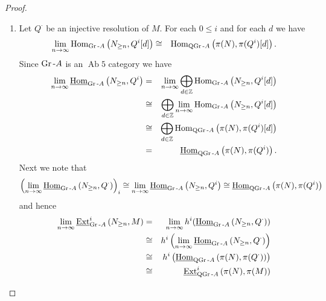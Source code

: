 \documentclass[dissertation.tex]{subfiles}
\begin{document}
\begin{prop}
  \begin{proof}
    \begin{enumerate}
    \item
      Let $Q^\cdot$ be an injective resolution of $M$.
      For each $0 \leq i$ and for each $d$ we have 
      \begin{eqnarray*}
        \lim_{n \rightarrow \infty}\Hom{\Gr{A}}{N_{\geq n}, Q^i[d]} &\cong& 
        \Hom{\QGr{A}}{\pi(N), \pi(Q^i)[d]}.
      \end{eqnarray*}
      Since $\Gr{A}$ is an $\operatorname{Ab} 5$ category we have
      \begin{eqnarray*}
        \lim_{n \rightarrow \infty}\HOM{\Gr{A}}{N_{\geq n}, Q^i} &=&
        \lim_{n \rightarrow \infty}\bigoplus_{d \in \Z} \Hom{\Gr{A}}{N_{\geq n}, Q^i[d]}\\
        &\cong& \bigoplus_{d \in \Z} \lim_{n \rightarrow \infty}\Hom{\Gr{A}}{N_{\geq n}, Q^i[d]}\\
        &\cong& \bigoplus_{d \in \Z} \Hom{\QGr{A}}{\pi(N), \pi(Q^i)[d]}\\
        &=&\HOM{\QGr{A}}{\pi(N), \pi(Q^i)}.
      \end{eqnarray*}
      Next we note that
      $$\left(\lim_{n \rightarrow \infty} \HOM{\Gr{A}}{N_{\geq n}, Q^\cdot}\right)_i \cong \lim_{n \rightarrow \infty}\HOM{\Gr{A}}{N_{\geq n}, Q^i} \cong \HOM{\QGr{A}}{\pi(N), \pi(Q^i)}$$ and hence
      \begin{eqnarray*}
        \lim_{n \rightarrow \infty} \EXT{i}{\Gr{A}}{N_{\geq n}, M} &=& 
        \lim_{n \rightarrow \infty} h^i(\HOM{\Gr{A}}{N_{\geq n}, Q^\cdot})\\
        &\cong& h^i\left(\lim_{n \rightarrow \infty} \HOM{\Gr{A}}{N_{\geq n}, Q^\cdot}\right)\\
        &\cong& h^i\left(\HOM{\QGr{A}}{\pi(N), \pi(Q^\cdot)}\right)\\
        &\cong& \EXT{i}{\QGr{A}}{\pi(N), \pi(M)}
      \end{eqnarray*}

\end{enumerate}
\end{proof}
\end{prop}
\end{document}
